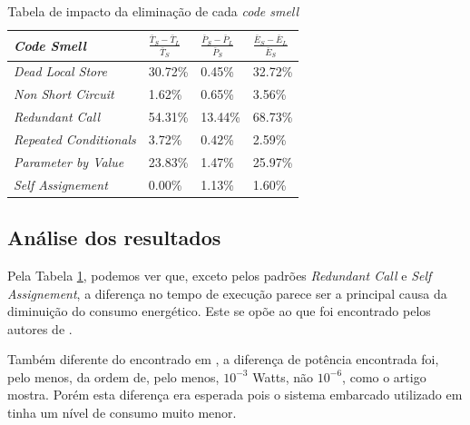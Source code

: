 \begin{table}[h]
\centering
\begin{tabular}{|l|l|l|l|}
\hline
\textit{Code Smell}            & $ \frac{\bar{T}_{S} - \bar{T}_{L}}{\bar{T}_{S}} $ & $ \frac{\bar{P}_{S} - \bar{P}_{L}}{\bar{P}_{S}} $ & $ \frac{\bar{E}_{S} - \bar{E}_{L}}{\bar{E}_{S}} $ \\ \hline
\textit{Dead Local Store}      & 30.72\%                                           & 0.45\%                                            & 32.72\%                                           \\ \hline
\textit{Non Short Circuit}     & 1.62\%                                            & 0.65\%                                            & 3.56\%                                            \\ \hline
\textit{Redundant Call}        & 54.31\%                                           & 13.44\%                                           & 68.73\%                                           \\ \hline
\textit{Repeated Conditionals} & 3.72\%                                            & 0.42\%                                            & 2.59\%                                            \\ \hline
\textit{Parameter by Value}    & 23.83\%                                           & 1.47\%                                            & 25.97\%                                           \\ \hline
\textit{Self Assignement}      & 0.00\%                                            & 1.13\%                                            & 1.60\%                                            \\ \hline
\end{tabular}
\caption{Tabela de impacto da eliminação de cada \emph{code smell}}
\label{tab:cs_impact}
\end{table}

\subsection{Análise dos resultados}
Pela Tabela \ref{tab:cs_impact}, podemos ver que, exceto pelos padrões \emph{Redundant Call} e \emph{Self Assignement}, a diferença no tempo de execução parece ser a principal causa da diminuição do consumo energético. Este se opõe ao que foi encontrado pelos autores de \cite{vetro2013definition}.

Também diferente do encontrado em \cite{vetro2013definition}, a diferença de potência encontrada foi, pelo menos, da ordem de, pelo menos, $ 10^{-3} $ Watts, não $ 10^{-6} $, como o artigo mostra. Porém esta diferença era esperada pois o sistema embarcado utilizado em \cite{vetro2013definition} tinha um nível de consumo muito menor.

